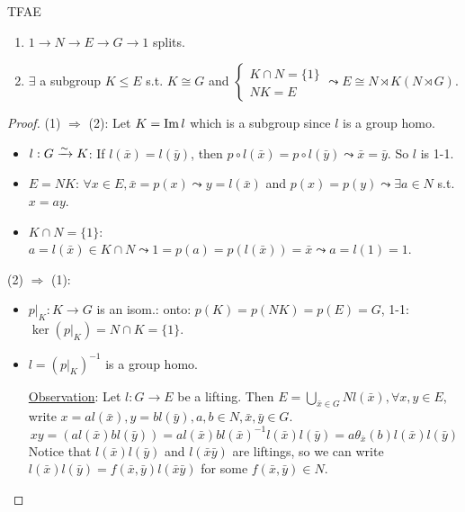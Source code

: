 \begin{prop} TFAE
  \begin{enumerate}
    \item $1\to N\to E\to G\to 1$ splits.
    \item $\exists$ a subgroup $K \le E$ s.t. $K \cong G$ and
      $\begin{cases} K \cap N = \{1\} \\ NK = E\end{cases}
        \leadsto E \cong N \rtimes K (N \rtimes G)$.
  \end{enumerate}
  \begin{proof}
    (1) $\Rightarrow$ (2): Let $K = \operatorname{Im} l$ which is a subgroup since $l$
    is a group homo.
    \begin{itemize}
      \item $l: G \xrightarrow{\sim} K$: If $l(\bar{x}) = l(\bar{y})$, then
        $p \circ l(\bar{x}) = p\circ l(\bar{y}) \leadsto \bar{x} = \bar{y}$.
        So $l$ is 1-1.
      \item $E = NK$: $\forall x \in E, \bar{x} = p(x) \leadsto
        y = l(\bar{x})$ and $p(x) = p(y) \leadsto \exists a \in N$ s.t.
        $x = ay$.
      \item $K \cap N = \{1\}$:
        $a = l(\bar{x}) \in K \cap N \leadsto 1 = p(a) = p(l(\bar{x})) = \bar{x}
        \leadsto a = l(1) = 1$.
    \end{itemize}

    (2) $\Rightarrow$ (1):
    \begin{itemize}
      \item $p \big|_K: K \to G$ is an isom.:
        onto: $p(K) = p(NK) = p(E) = G$, 1-1: $\ker(p\big|_K) = N \cap K = \{1\}$.
      \item $l = \left(p\big|_K\right)^{-1}$ is a group homo.

        \underline{Observation}: Let $l: G\to E$ be a lifting.
        Then $E = \bigcup_{\bar{x}\in G} Nl(\bar{x}), \forall x, y \in E$,
        write $x = al(\bar{x}), y = bl(\bar{y}), a, b\in N, \bar{x},\bar{y}\in G$.
        \[
          xy = (al(\bar{x})bl(\bar{y})) = al(\bar{x})bl(\bar{x})^{-1}l(\bar{x})l(\bar{y})
          = a \theta_{\bar{x}}(b)l(\bar{x})l(\bar{y})
        \]
        Notice that $l(\bar{x})l(\bar{y})$ and $l(\bar{x}\bar{y})$ are liftings,
        so we can write $l(\bar{x})l(\bar{y}) = f(\bar{x}, \bar{y})l(\bar{x}\bar{y})$
        for some $f(\bar{x}, \bar{y})\in N$.
        \qedhere
    \end{itemize}
  \end{proof}
\end{prop}

